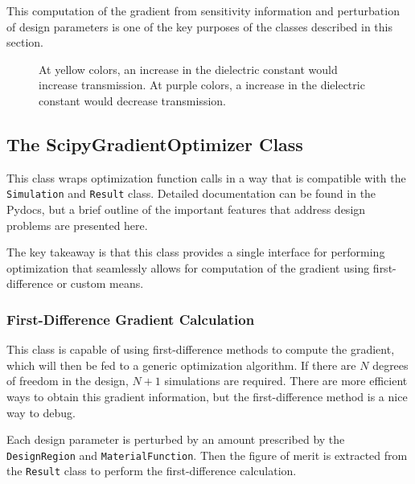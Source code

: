 \documentclass[12pt]{article}
\begin{document}
This computation of the gradient from sensitivity information and perturbation of design parameters is one of the key purposes of the classes described in this section.

\begin{figure}
\caption{At yellow colors, an increase in the dielectric constant would increase transmission. At purple colors, a increase in the dielectric constant would decrease transmission.}
\label{fig.sensitivity_information}
\end{figure}

\subsection{The ScipyGradientOptimizer Class}
This class wraps optimization function calls in a way that is compatible with the \texttt{Simulation} and \texttt{Result} class. Detailed documentation can be found in the Pydocs, but a brief outline of the important features that address design problems are presented here.

The key takeaway is that this class provides a single interface for performing optimization that seamlessly allows for computation of the gradient using first-difference or custom means.

\subsubsection{First-Difference Gradient Calculation}
This class is capable of using first-difference methods to compute the gradient, which will then be fed to a generic optimization algorithm. If there are $N$ degrees of freedom in the design, $N+1$ simulations are required. There are more efficient ways to obtain this gradient information, but the first-difference method is a nice way to debug.

Each design parameter is perturbed by an amount prescribed by the \texttt{DesignRegion} and \texttt{MaterialFunction}. Then the figure of merit is extracted from the \texttt{Result} class to perform the first-difference calculation.
\end{document}
